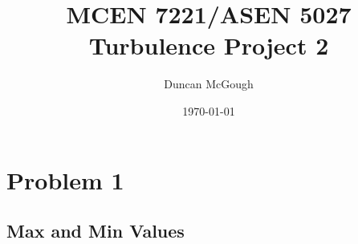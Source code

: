 \documentclass[12pt]{article}
\title{MCEN 7221/ASEN 5027 Turbulence Project 2}
\author{Duncan McGough}
\date{\today}
\begin{document}
\maketitle

\section{Problem 1}
\subsection{Max and Min Values}









%
%
\end{document}
